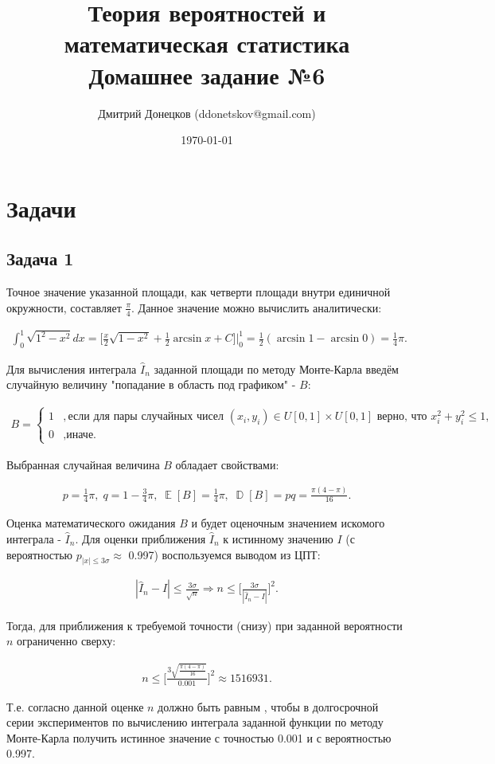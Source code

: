 \documentclass[a4paper,11pt]{article}
\title{\vspace{-1.5cm}Теория вероятностей и математическая статистика \\
Домашнее задание №6}
\author{Дмитрий Донецков (ddonetskov@gmail.com)}
\date{\today}
\DeclareMathOperator*{\D}{\mathbb{D}}   %
\DeclareMathOperator*{\E}{\mathbb{E}}   %
\begin{document}
\maketitle

\section{Задачи}

\subsection{Задача 1}

Точное значение указанной площади, как четверти площади внутри единичной окружности, составляет $\frac{\pi}{4}$. Данное значение можно вычислить аналитически:

\begin{align*}
\int_{0}^{1} \sqrt{1^2 - x^2}dx 
= \bigg[\frac{x}{2}\sqrt{1-x^2} + \frac{1}{2}\arcsin{x} + C\bigg]\bigg\rvert_0^1
= \frac{1}{2}(\arcsin{1} - \arcsin{0}) = \frac{1}{4}\pi.
\end{align*}

Для вычисления интеграла $\hat{I}_n$ заданной площади по методу Монте-Карла введём случайную величину "попадание в область под графиком" - $B$:

\begin{align*}
B =
\begin{cases}
  1 & , \text{если для пары случайных чисел } (x_i, y_i) \in U[0,1] \times U[0,1] \text{ верно, что } x_i^2 + y_i^2 \leq 1, \\
  0 & , \text{иначе.}
\end{cases}
\end{align*}

Выбранная случайная величина $B$ обладает свойствами:

\begin{align*}
p = \frac{1}{4}\pi, \; q = 1 - \frac{3}{4}\pi, \; 
\E[B] = \frac{1}{4}\pi, \; \D[B] = pq = \frac{\pi(4-\pi)}{16}.
\end{align*}

Оценка математического ожидания $B$ и будет оценочным значением искомого интеграла - $\hat{I}_n$. Для оценки приближения $\hat{I}_n$ к истинному значению $I$ (с вероятностью $p_{|x| \leq 3\sigma} \approx$ 0.997) воспользуемся выводом из ЦПТ:

\begin{align*}
|\hat{I}_n - I| \leq \frac{3\sigma}{\sqrt{n}}
\Rightarrow
n \leq \bigg[\frac{3\sigma}{|\hat{I}_n - I|}\bigg]^2.
\end{align*}

Тогда, для приближения к требуемой точности (снизу) при заданной вероятности $n$ ограниченно сверху:

\begin{align*}
n \leq \bigg[\frac{3\sqrt{\frac{\pi(4-\pi)}{16}}}{0.001}\bigg]^2 \approx 1516931.
\end{align*}

Т.е. согласно данной оценке $n$ должно быть равным , чтобы в долгосрочной серии экспериментов по вычислению интеграла заданной функции по методу Монте-Карла получить истинное значение с точностью 0.001 и с вероятностью 0.997.
\end{document}
